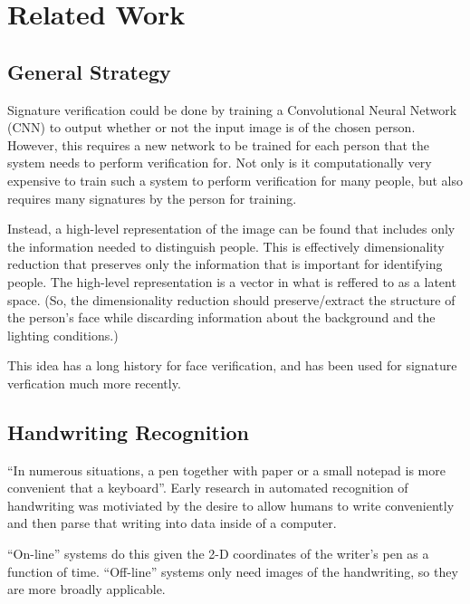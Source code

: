 \section{Related Work}\label{sec:related_work}


\subsection{General Strategy}

Signature verification could be done by training a Convolutional Neural Network (CNN) to output whether or not the input image is of the chosen person.
However, this requires a new network to be trained for each person that the system needs to perform verification for.
Not only is it computationally very expensive to train such a system to perform verification for many people, but also requires many signatures by the person for training.

Instead, a high-level representation of the image can be found that includes only the information needed to distinguish people.
This is effectively dimensionality reduction that preserves only the information that is important for identifying people.
The high-level representation is a vector in what is reffered to as a latent space.
(So, the dimensionality reduction should preserve/extract the structure of the person's face while discarding information about the background and the lighting conditions.)

This idea has a long history for face verification\cite{LeCun}, and has been used for signature verfication much more recently\cite{sig_net}.


\subsection{Handwriting Recognition} %

``In numerous situations, a pen together with paper or a small notepad is more convenient that a keyboard''\cite{handwriting_survey}.
Early research in automated recognition of handwriting was motiviated by the desire to allow humans to write conveniently and then parse that writing into data inside of a computer.

``On-line'' systems do this given the 2-D coordinates of the writer's pen as a function of time.%
``Off-line'' systems only need images of the handwriting, so they are more broadly applicable\cite{handwriting_survey}.

